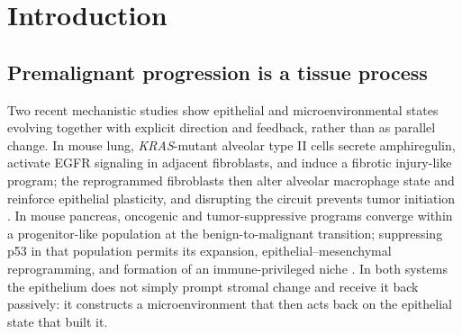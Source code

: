 %
%

\chapter{Introduction}
\label{chap:intro}

\section{Premalignant progression is a tissue process}
\label{sec:intro-premalignancy}

Two recent mechanistic studies show epithelial and microenvironmental states
evolving together with explicit direction and feedback, rather than as parallel
change. In mouse lung, \emph{KRAS}-mutant alveolar type II cells secrete
amphiregulin, activate EGFR signaling in adjacent fibroblasts, and induce a
fibrotic injury-like program; the reprogrammed fibroblasts then alter alveolar
macrophage state and reinforce epithelial plasticity, and disrupting the
circuit prevents tumor initiation \autocite{Cardoso2026-kp}. In mouse pancreas,
oncogenic and tumor-suppressive programs converge within a progenitor-like
population at the benign-to-malignant transition; suppressing p53 in that
population permits its expansion, epithelial--mesenchymal reprogramming, and
formation of an immune-privileged niche \autocite{Reyes2026-yr}. In both
systems the epithelium does not simply prompt stromal change and receive it
back passively: it constructs a microenvironment that then acts back on the
epithelial state that built it.

